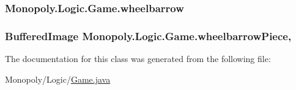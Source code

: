 \subsubsection[{\texorpdfstring{wheelbarrow}{wheelbarrow}}]{ Monopoly.\+Logic.\+Game.\+wheelbarrow\hspace{0.3cm}{\ttfamily [private]}}\hypertarget{class_monopoly_1_1_logic_1_1_game_a1374ad17918482f5489026d9e26bcd11}{}\label{class_monopoly_1_1_logic_1_1_game_a1374ad17918482f5489026d9e26bcd11}
\subsubsection[{\texorpdfstring{wheelbarrow\+Piece}{wheelbarrowPiece}}]{\setlength{\rightskip}{0pt plus 5cm}Buffered\+Image Monopoly.\+Logic.\+Game.\+wheelbarrow\+Piece\hspace{0.3cm}{\ttfamily [static]}, {\ttfamily [protected]}}\hypertarget{class_monopoly_1_1_logic_1_1_game_aa420c0448988b31e3b43a7181fbf957f}{}\label{class_monopoly_1_1_logic_1_1_game_aa420c0448988b31e3b43a7181fbf957f}


The documentation for this class was generated from the following file\+:\begin{DoxyCompactItemize}
\item 
Monopoly/\+Logic/\hyperlink{_game_8java}{Game.\+java}\end{DoxyCompactItemize}
